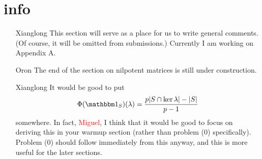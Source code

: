 \section*{info}
\begin{itemize}
	\item[Xianglong] This section will serve as a place for us to write general comments. (Of course, it will be omitted from submissions.) Currently I am working on Appendix A.

    \item[Oron] The end of the section on nilpotent matrices is still under construction.
    
    \item[Xianglong] It would be good to put
    \[
    	\Phi(\IND_S)(\lambda) = \frac{p|S \cap \ker \lambda| - |S|}{p-1}
    \]
    somewhere. In fact, \textcolor{red}{Miguel}, I think that it would be good to focus on deriving this in your warmup section (rather than problem (0) specifically). Problem (0) should follow immediately from this anyway, and this is more useful for the later sections.
\end{itemize}
